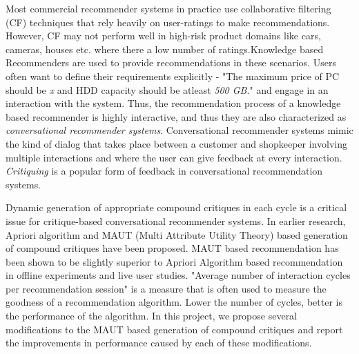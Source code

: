\abstract
\vspace*{24pt}

Most commercial recommender systems in practice use collaborative filtering (CF) techniques that rely heavily on user-ratings to make recommendations. However, CF may not perform well in high-risk product domains like cars, cameras, houses etc. where there a low number of ratings.Knowledge based Recommenders are used to provide recommendations in these scenarios.
Users often want to define their requirements explicitly - "The maximum price of PC should be \textit{x} and HDD capacity should be atleast \textit{500 GB}." and engage in an interaction with the system.
Thus, the recommendation process of a knowledge based recommender is highly interactive, and thus they are also characterized as \textit{conversational recommender systems}. Conversational recommender systems mimic the kind of dialog that takes place between a customer and shopkeeper involving multiple interactions and where the user can give feedback at every interaction.
\textit{Critiquing} is a popular form of feedback in conversational recommendation systems.

Dynamic generation of appropriate compound critiques in each cycle is a critical issue for critique-based conversational recommender systems.
In earlier research, Apriori algorithm and MAUT (Multi Attribute Utility Theory) based generation of compound critiques have been proposed.
MAUT based recommendation has been shown to be slightly superior to Apriori Algorithm based recommendation in offline experiments and live user studies.
"Average number of interaction cycles per recommendation session" is a measure that is often used to measure the goodness of a recommendation algorithm. Lower the number of cycles, better is the performance of the algorithm. 
In this project, we propose several modifications to the MAUT based generation of compound critiques and report the improvements in performance caused by each of these modifications.






